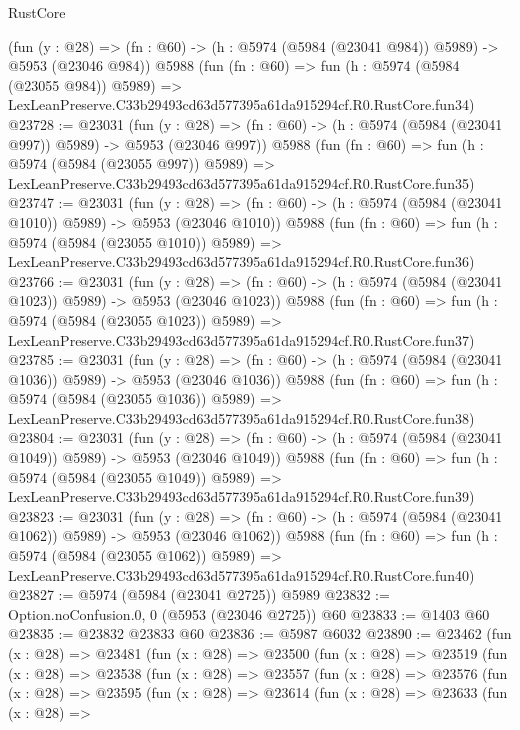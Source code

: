 \begin{lexlean}{RustCore}
\begin{coremodule}
    (fun (y : @28) => (fn : @60) -> (h : @5974 (@5984 (@23041 @984)) @5989) -> @5953 (@23046 @984))
    @5988
    (fun (fn : @60) =>
    fun (h : @5974 (@5984 (@23055 @984)) @5989) =>
    LexLeanPreserve.C33b29493cd63d577395a61da915294cf.R0.RustCore.fun34)
@23728 := @23031
    (fun (y : @28) => (fn : @60) -> (h : @5974 (@5984 (@23041 @997)) @5989) -> @5953 (@23046 @997))
    @5988
    (fun (fn : @60) =>
    fun (h : @5974 (@5984 (@23055 @997)) @5989) =>
    LexLeanPreserve.C33b29493cd63d577395a61da915294cf.R0.RustCore.fun35)
@23747 := @23031
    (fun (y : @28) =>
    (fn : @60) -> (h : @5974 (@5984 (@23041 @1010)) @5989) -> @5953 (@23046 @1010))
    @5988
    (fun (fn : @60) =>
    fun (h : @5974 (@5984 (@23055 @1010)) @5989) =>
    LexLeanPreserve.C33b29493cd63d577395a61da915294cf.R0.RustCore.fun36)
@23766 := @23031
    (fun (y : @28) =>
    (fn : @60) -> (h : @5974 (@5984 (@23041 @1023)) @5989) -> @5953 (@23046 @1023))
    @5988
    (fun (fn : @60) =>
    fun (h : @5974 (@5984 (@23055 @1023)) @5989) =>
    LexLeanPreserve.C33b29493cd63d577395a61da915294cf.R0.RustCore.fun37)
@23785 := @23031
    (fun (y : @28) =>
    (fn : @60) -> (h : @5974 (@5984 (@23041 @1036)) @5989) -> @5953 (@23046 @1036))
    @5988
    (fun (fn : @60) =>
    fun (h : @5974 (@5984 (@23055 @1036)) @5989) =>
    LexLeanPreserve.C33b29493cd63d577395a61da915294cf.R0.RustCore.fun38)
@23804 := @23031
    (fun (y : @28) =>
    (fn : @60) -> (h : @5974 (@5984 (@23041 @1049)) @5989) -> @5953 (@23046 @1049))
    @5988
    (fun (fn : @60) =>
    fun (h : @5974 (@5984 (@23055 @1049)) @5989) =>
    LexLeanPreserve.C33b29493cd63d577395a61da915294cf.R0.RustCore.fun39)
@23823 := @23031
    (fun (y : @28) =>
    (fn : @60) -> (h : @5974 (@5984 (@23041 @1062)) @5989) -> @5953 (@23046 @1062))
    @5988
    (fun (fn : @60) =>
    fun (h : @5974 (@5984 (@23055 @1062)) @5989) =>
    LexLeanPreserve.C33b29493cd63d577395a61da915294cf.R0.RustCore.fun40)
@23827 := @5974 (@5984 (@23041 @2725)) @5989
@23832 := Option.noConfusion.{0, 0} (@5953 (@23046 @2725)) @60
@23833 := @1403 @60
@23835 := @23832 @23833 @60
@23836 := @5987 @6032
@23890 := @23462
    (fun (x : @28) =>
    @23481
      (fun (x : @28) =>
      @23500
        (fun (x : @28) =>
        @23519
          (fun (x : @28) =>
          @23538
            (fun (x : @28) =>
            @23557
              (fun (x : @28) =>
              @23576
                (fun (x : @28) =>
                @23595
                  (fun (x : @28) =>
                  @23614
                    (fun (x : @28) =>
                    @23633
                      (fun (x : @28) =>

\end{coremodule}
\end{lexlean}
